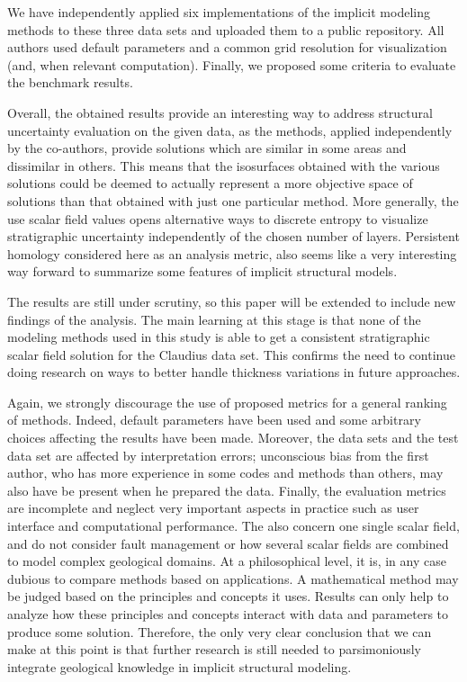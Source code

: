 \documentclass[preprint]{ring20}
\begin{document}
We have independently applied six implementations of the implicit modeling methods to these three data sets and uploaded them to a public repository. All authors used default parameters and a common grid resolution for visualization (and, when relevant computation). Finally, we proposed some criteria to evaluate the benchmark results. 

Overall, the obtained results provide an interesting way to address structural uncertainty evaluation on the given data, as the methods, applied independently by the co-authors, provide solutions which are similar in some areas and dissimilar in others. This means that the isosurfaces obtained with the various solutions could be deemed to actually represent a more objective space of solutions than that obtained with just one particular method. More generally, the use scalar field values opens alternative ways to discrete entropy to visualize stratigraphic uncertainty independently of the chosen number of layers. Persistent homology considered here as an analysis metric, also seems like a very interesting way forward to summarize some features of implicit structural models.  

The results are still under scrutiny, so this paper will be extended to include new findings of the analysis. The main learning at this stage is that none of the modeling methods used in this study is able to get a consistent stratigraphic scalar field solution for the Claudius data set. This confirms the need to continue doing research on ways to better handle thickness variations in future approaches. 

Again, we strongly discourage the use of proposed metrics for a general ranking of methods. Indeed, default parameters have been used and some arbitrary choices affecting the results have been made. Moreover, the data sets and the test data set are affected by interpretation errors; unconscious bias from the first author, who has more experience in some codes and methods than others, may also have be present when he prepared the data. Finally, the evaluation metrics are incomplete and neglect very important aspects in practice such as user interface and computational performance. The also concern one single scalar field, and do not consider fault management or how several scalar fields are combined to model complex geological domains. At a philosophical level, it is, in any case dubious to compare methods based on applications. A mathematical method may be judged based on the principles and concepts it uses. Results can only help to analyze how these principles and concepts interact with data and parameters to produce some solution. Therefore, the only very clear conclusion that we can make at this point is that further research is still needed to parsimoniously integrate geological knowledge in implicit structural modeling. 
\end{document}
